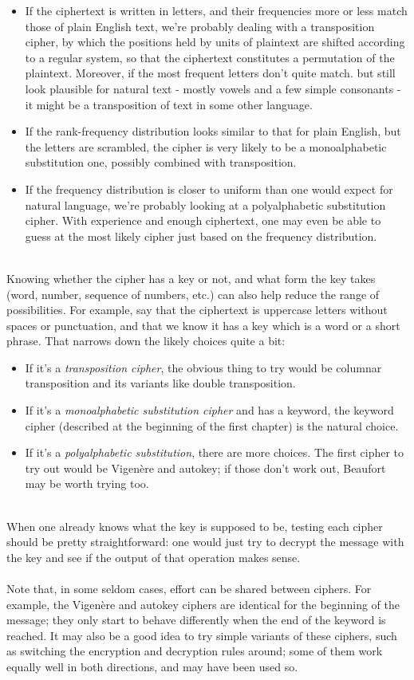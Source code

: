 \documentclass[Lau,binding=0.6cm,oneside]{sapthesis}
\begin{document}
\begin{itemize}
	\item If the ciphertext is written in letters, and their frequencies more or less match those of plain English text, we're probably dealing with a transposition cipher, by which the positions held by units of plaintext are shifted according to a regular system, so that the ciphertext constitutes a permutation of the plaintext. Moreover, if the most frequent letters don't quite match. but still look plausible for natural text - mostly vowels and a few simple consonants - it might be a transposition of text in some other language.
	\item If the rank-frequency distribution looks similar to that for plain English, but the letters are scrambled, the cipher is very likely to be a monoalphabetic substitution one, possibly combined with transposition.
	\item If the frequency distribution is closer to uniform than one would expect for natural language, we're probably looking at a polyalphabetic substitution cipher. With experience and enough ciphertext, one may even be able to guess at the most likely cipher just based on the frequency distribution.
\end{itemize}
\ \\
Knowing whether the cipher has a key or not, and what form the key takes (word, number, sequence of numbers, etc.) can also help reduce the range of possibilities. For example, say that the ciphertext is uppercase letters without spaces or punctuation, and that we know it has a key which is a word or a short phrase. That narrows down the likely choices quite a bit:

\begin{itemize}
	\item If it's a \textit{transposition cipher}, the obvious thing to try would be columnar transposition and its variants like double transposition.
	\item If it's a \textit{monoalphabetic substitution cipher} and has a keyword, the keyword cipher (described at the beginning of the first chapter) is the natural choice.
	\item If it's a \textit{polyalphabetic substitution}, there are more choices. The first cipher to try out would be Vigenère and autokey; if those don't work out, Beaufort may be worth trying too.
\end{itemize}
\ \\
When one already knows what the key is supposed to be, testing each cipher should be pretty straightforward: one would just try to decrypt the message with the key and see if the output of that operation makes sense.\\\\
Note that, in some seldom cases, effort can be shared between ciphers. For example, the Vigenère and autokey ciphers are identical for the beginning of the message; they only start to behave differently when the end of the keyword is reached. It may also be a good idea to try simple variants of these ciphers, such as switching the encryption and decryption rules around; some of them work equally well in both directions, and may have been used so.
\end{document}
